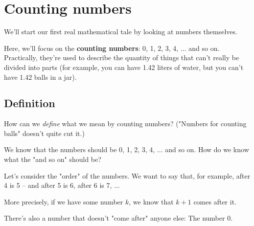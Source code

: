 


\section{Counting numbers}

We'll start our first real mathematical tale by looking at numbers themselves. 

Here, we'll focus on the \textbf{counting numbers}: 0, 1, 2, 3, 4, ... and so on. Practically, they're used to describe the quantity of things that can't really be divided into parts (for example, you can have 1.42 liters of water, but you can't have 1.42 balls in a jar). 

\subsection{Definition}

How can we \emph{define} what we mean by counting numbers? ("Numbers for counting balls" doesn't quite cut it.)

We know that the numbers should be 0, 1, 2, 3, 4, ... and so on. How do we know what the "and so on" should be?

Let's consider the "order" of the numbers. We want to say that, for example, after 4 is 5 -- and after 5 is 6, after 6 is 7, ... 

More precisely, if we have some number $k$, we know that $k+1$ comes after it. 

There's also a number that doesn't "come after" anyone else: The number 0.

